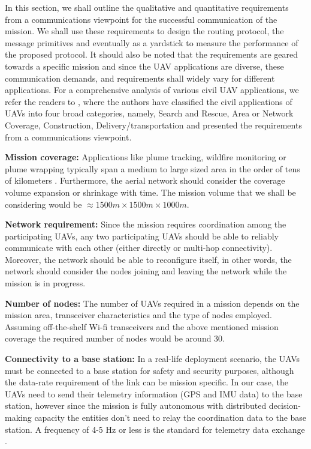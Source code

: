 In this section, we shall outline the qualitative and quantitative requirements from a communications viewpoint for the successful communication of the mission. We shall use these requirements to design the routing protocol, the message primitives and eventually as a yardstick to measure the performance of the proposed protocol. It should also be noted that the requirements are geared towards a specific mission and since the UAV applications are diverse, these communication demands, and requirements shall widely vary for different applications. For a comprehensive analysis of various civil UAV applications, we refer the readers to \cite{7463007}, where the authors have classified the civil applications of UAVs into four broad categories, namely, Search and Rescue, Area or Network Coverage, Construction, Delivery/transportation and presented the requirements from a communications viewpoint. 

\textbf{Mission coverage:} Applications like plume tracking, wildfire monitoring or plume wrapping typically span a medium to large sized area in the order of tens of kilometers \cite{7463007}. Furthermore, the aerial network should consider the coverage volume expansion or shrinkage with time. The mission volume that we shall be considering would be $ \approx 1500 m \times 1500 m \times 1000 m $. 

\textbf{Network requirement:} Since the mission requires coordination among the participating UAVs, any two participating UAVs should be able to reliably communicate with each other (either directly or multi-hop connectivity). Moreover, the network should be able to reconfigure itself, in other words, the network should consider the nodes joining and leaving the network while the mission is in progress.

\textbf{Number of nodes:} The number of UAVs required in a mission depends on the mission area, transceiver characteristics and the type of nodes employed. Assuming off-the-shelf Wi-fi transceivers and the above mentioned mission coverage the required number of nodes would be around 30. 

\textbf{Connectivity to a base station:} In a real-life deployment scenario, the UAVs must be connected to a base station for safety and security purposes, although the data-rate requirement of the link can be mission specific. In our case, the UAVs need to send their telemetry information (GPS and IMU data) to the base station, however since the mission is fully autonomous with distributed decision-making capacity the entities don’t need to relay the coordination data to the base station. A frequency of 4-5 Hz or less is the standard for telemetry data exchange \cite{7463007}. 

